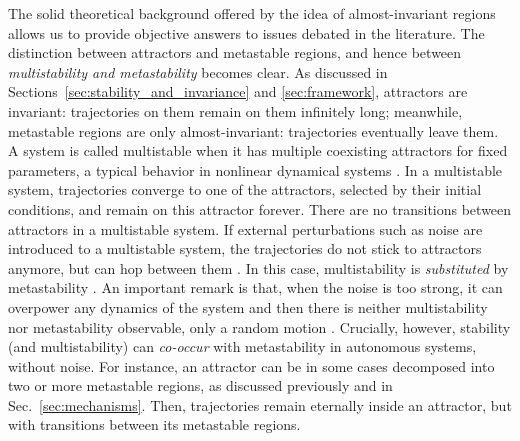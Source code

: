 The solid theoretical background offered by the idea of almost-invariant regions allows us to provide objective answers to issues debated in the literature. The distinction between attractors and metastable regions, and hence between \textit{multistability and metastability} becomes clear. As discussed in Sections~\ref{sec:stability_and_invariance} and \ref{sec:framework}, attractors are invariant: trajectories on them remain on them infinitely long; meanwhile, metastable regions are only almost-invariant: trajectories eventually leave them. 
A system is called multistable when it has multiple coexisting attractors for fixed parameters, a typical behavior in nonlinear dynamical systems \cite{feudel2008complex, feudel2018multistability}. In a multistable system, trajectories converge to one of the attractors, selected by their initial conditions, and remain on this attractor forever. There are no transitions between attractors in a multistable system. If external perturbations such as noise are introduced to a multistable system, the trajectories do not stick to attractors anymore, but can hop between them \cite{hangi1990reaction}. In this case, multistability is \textit{substituted} by metastability \cite{pisarchik2014control}. An important remark is that, when the noise is too strong, it can overpower any dynamics of the system and then there is neither multistability nor metastability observable, only a random motion \cite{kraut2002multistability}.
Crucially, however, stability (and multistability) can \textit{co-occur} with metastability in autonomous systems, without noise. For instance, an attractor can be in some cases decomposed into two or more metastable regions, as discussed previously and in Sec.~\ref{sec:mechanisms}. Then, trajectories remain eternally inside an attractor, but with transitions between its metastable regions.  

